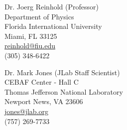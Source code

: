\documentclass[margin]{res}
\begin{document}
\begin{resume}
                                  Dr. Joerg Reinhold (Professor) \\
                                  Department of Physics \\
                                  Florida International University \\
                                  Miami, FL 33125 \\
                                 \Email \hspace{0.5mm} \href{mailto:reinhold@fiu.edu}{reinhold@fiu.edu} \\                           
                                 \phone \hspace{0.5mm} (305) 348-6422
   
                                  Dr. Mark Jones (JLab Staff Scientist) \\
                                  CEBAF Center - Hall C \\
                                  Thomas Jefferson National Laboratory \\
                                  Newport News, VA 23606 \\
                                 \Email \hspace{0.5mm} \href{mailto:jones@jlab.org}{jones@jlab.org} \\                           
                                 \phone \hspace{0.5mm} (757) 269-7733                               
\end{resume} 
\end{document}
